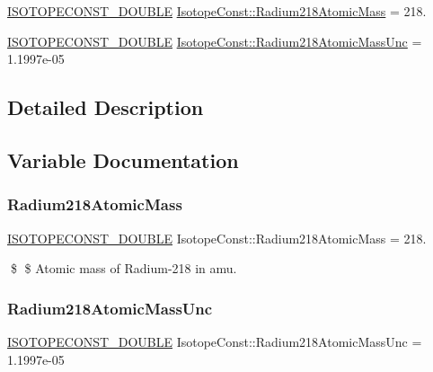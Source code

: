 \begin{DoxyCompactItemize}
\item 
\mbox{\hyperlink{group___isotope_const-_macros_ga8f45a7272ce02c0b4c65c44636ed719a}{I\+S\+O\+T\+O\+P\+E\+C\+O\+N\+S\+T\+\_\+\+D\+O\+U\+B\+LE}} \mbox{\hyperlink{group___isotope_const-_radium-_ra218_ga6a18148b7c42f8e229cd0435bb4da937}{Isotope\+Const\+::\+Radium218\+Atomic\+Mass}} = 218.
\item 
\mbox{\hyperlink{group___isotope_const-_macros_ga8f45a7272ce02c0b4c65c44636ed719a}{I\+S\+O\+T\+O\+P\+E\+C\+O\+N\+S\+T\+\_\+\+D\+O\+U\+B\+LE}} \mbox{\hyperlink{group___isotope_const-_radium-_ra218_ga7be123f07a136f77a92cf9f80bee9dbc}{Isotope\+Const\+::\+Radium218\+Atomic\+Mass\+Unc}} = 1.\+1997e-\/05
\end{DoxyCompactItemize}


\subsection{Detailed Description}


\subsection{Variable Documentation}
\mbox{\label{group___isotope_const-_radium-_ra218_ga6a18148b7c42f8e229cd0435bb4da937}} 
\subsubsection{\texorpdfstring{Radium218\+Atomic\+Mass}{Radium218AtomicMass}}
{\footnotesize\ttfamily \mbox{\hyperlink{group___isotope_const-_macros_ga8f45a7272ce02c0b4c65c44636ed719a}{I\+S\+O\+T\+O\+P\+E\+C\+O\+N\+S\+T\+\_\+\+D\+O\+U\+B\+LE}} Isotope\+Const\+::\+Radium218\+Atomic\+Mass = 218.}

\$ \$ Atomic mass of Radium-\/218 in amu. \mbox{\label{group___isotope_const-_radium-_ra218_ga7be123f07a136f77a92cf9f80bee9dbc}} 
\subsubsection{\texorpdfstring{Radium218\+Atomic\+Mass\+Unc}{Radium218AtomicMassUnc}}
{\footnotesize\ttfamily \mbox{\hyperlink{group___isotope_const-_macros_ga8f45a7272ce02c0b4c65c44636ed719a}{I\+S\+O\+T\+O\+P\+E\+C\+O\+N\+S\+T\+\_\+\+D\+O\+U\+B\+LE}} Isotope\+Const\+::\+Radium218\+Atomic\+Mass\+Unc = 1.\+1997e-\/05}


